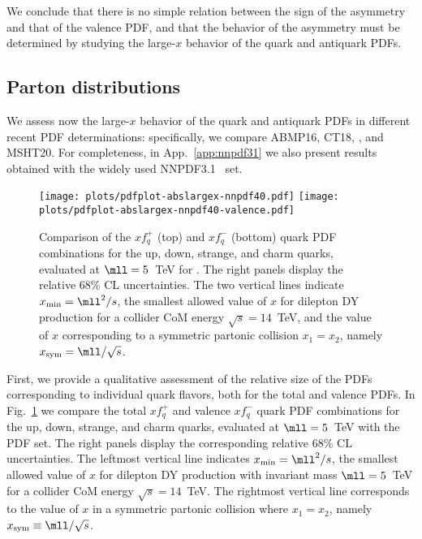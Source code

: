 We conclude that there
is no simple relation between the sign of the asymmetry and that of
the valence PDF, and that the
behavior of the asymmetry must be determined by studying the large-$x$
behavior of the quark and antiquark PDFs.

\subsection{Parton distributions}
\label{sec:subsec-largexPDFs}

We assess now the large-$x$ behavior of
the quark and antiquark PDFs in different recent PDF
determinations: specifically, we compare
 ABMP16,
 CT18,  ,
 and MSHT20.
%
 For
completeness, in App.~\ref{app:nnpdf31} we also present results
obtained with the widely used NNPDF3.1~\cite{Ball:2017nwa} set.

\begin{figure}[!t]
 \centering
 \texttt{[image: plots/pdfplot-abslargex-nnpdf40.pdf]}
 \texttt{[image: plots/pdfplot-abslargex-nnpdf40-valence.pdf]}
 \caption{\small Comparison of the $xf^+_q$ (top) and $xf_q^-$ (bottom) quark
   PDF combinations for the up, down, strange, and charm quarks,
   evaluated at $\mll=5$~TeV for  \nnlo.
   The right panels display the relative 68\% CL uncertainties.
   The two vertical lines indicate $x_{\rm min}=\mll^2/s$, the
   smallest allowed value of $x$ 
   for dilepton DY production for a collider
   CoM energy $\sqrt{s}=14$~TeV, and the value of $x$
   corresponding to a symmetric partonic collision $x_1=x_2$, namely
 $x_{\rm  sym}=\mll/\sqrt{s}$.
 }    
 \label{fig:pdfplot-abslargex}
\end{figure}

First, we provide a qualitative assessment of the relative size of the
PDFs corresponding to
individual quark flavors, both for the total and valence PDFs.
In Fig.~\ref{fig:pdfplot-abslargex} we
compare  the total $xf^+_q$ and valence $xf_q^-$  quark
   PDF combinations for the up, down, strange, and charm quarks,
   evaluated at $\mll=5$~TeV with the  \nnlo PDF set.
   The right panels display the corresponding relative 68\% CL uncertainties.
  The leftmost vertical line indicates $x_{\rm min}=\mll^2/s$, the
  smallest allowed value of $x$ 
   for dilepton DY production with invariant mass $\mll=5$~TeV for a collider
   CoM energy $\sqrt{s}=14$~TeV.
   The rightmost vertical line corresponds to
   the value of $x$ in a symmetric partonic collision where $x_1=x_2$, namely
   $x_{\rm  sym}\equiv\mll/\sqrt{s}$.

